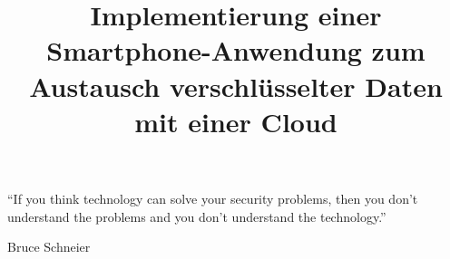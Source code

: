 \documentclass[10pt, a4paper]{scrreprt}
\begin{document}
\begin{titlepage}
\title{Implementierung einer Smartphone-Anwendung zum Austausch verschlüsselter Daten mit einer Cloud}
\maketitle
\end{titlepage}

\vspace*{\fill}
\begin{center}
“If you think technology can solve your security problems, then you don’t understand the problems and you don’t understand the technology.”
\end{center}
\begin{flushright}
Bruce Schneier
\end{flushright}
\vspace*{\fill}


\tableofcontents

\end{document}
